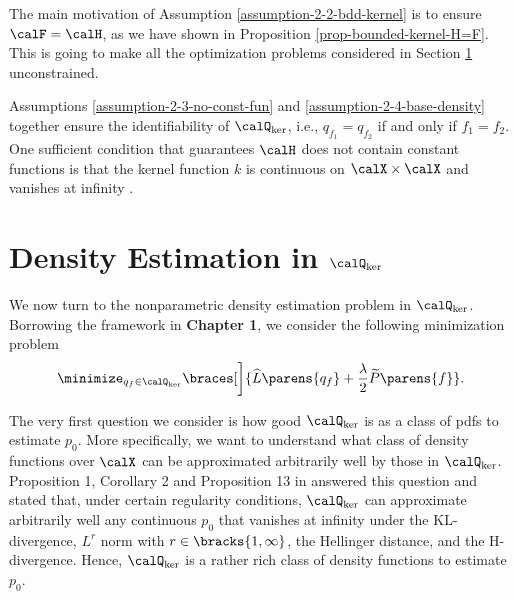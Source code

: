 \documentclass[12pt]{article}
\theoremstyle{definition}
\theoremstyle{theorem}
\theoremstyle{remark}
\begin{document}
The main motivation of Assumption \ref{assumption-2-2-bdd-kernel} is to ensure $\calF = \calH$, as we have shown in Proposition \ref{prop-bounded-kernel-H=F}. This is going to make all the optimization problems considered in Section \ref{section-density-estimation} unconstrained. 

Assumptions \ref{assumption-2-3-no-const-fun} and \ref{assumption-2-4-base-density} together ensure the identifiability of $\calQ_{\ker}$, i.e., $q_{f_1} = q_{f_2}$ if and only if $f_1 = f_2$. One sufficient condition that guarantees $\calH$ does not contain constant functions is that the kernel function $k$ is continuous on $\calX \times \calX$ and vanishes at infinity \parencite[see Remark 3(iii) in][]{Sriperumbudur-density-estimation-inf-exp-family}. 



\section{Density Estimation in $\calQ_{\ker}$}\label{section-density-estimation}


We now turn to the nonparametric density estimation problem in $\calQ_{\ker}$. Borrowing the framework in \textbf{\color{red} Chapter 1}, we consider the following minimization problem 
\begin{align}\label{eq-density-estimation-general-kef}
	\minimize_{q_f \in \calQ_{\ker}} \braces[\bigg]{\widehat{L} \parens{q_f} + \frac{\lambda}{2} \widetilde{P} \parens{f}}. 
\end{align}

The very first question we consider is how good $\calQ_{\ker}$ is as a class of pdfs to estimate $p_0$. More specifically, we want to understand what class of density functions over $\calX$ can be approximated arbitrarily well by those in $\calQ_{\ker}$. Proposition 1, Corollary 2 and Proposition 13 in \textcite{Sriperumbudur-density-estimation-inf-exp-family} answered this question and stated that, under certain regularity conditions, 
$\calQ_{\ker}$ can approximate arbitrarily well any continuous $p_0$ that vanishes at infinity under the KL-divergence, $L^r$ norm with $r \in \bracks{1, \infty}$, the Hellinger distance, and the H-divergence. Hence, $\calQ_{\ker}$ is a rather rich class of density functions to estimate $p_0$. 
\end{document}

